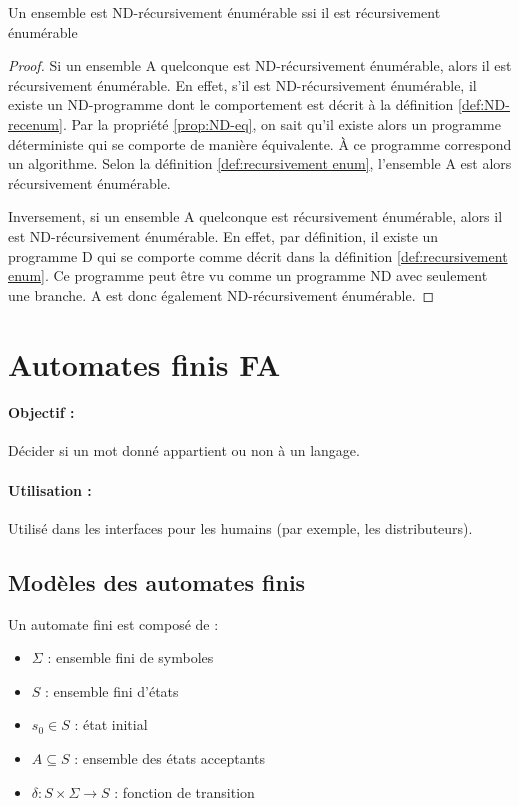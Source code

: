 \begin{myprop}
	Un ensemble est ND-récursivement énumérable ssi il est récursivement énumérable
	\begin{proof}
		Si un ensemble A quelconque est ND-récursivement énumérable, alors il est récursivement
		énumérable.
		En effet, s'il est ND-récursivement énumérable, il existe un ND-programme dont le comportement est décrit à la définition \ref{def:ND-recenum}.
		Par la propriété \ref{prop:ND-eq}, on sait qu'il existe alors un programme déterministe qui se comporte de manière équivalente. À ce programme correspond un algorithme.
		Selon la définition \ref{def:recursivement enum}, l'ensemble A est alors récursivement énumérable.

		Inversement, si un ensemble A quelconque est récursivement énumérable, alors il est ND-récursivement énumérable. En effet, par définition, il existe un programme D qui se comporte comme décrit dans la définition \ref{def:recursivement enum}.
		Ce programme peut être vu comme un programme ND avec seulement une branche. A est donc également ND-récursivement énumérable.
	\end{proof}

\end{myprop}

\section{Automates finis FA}
\label{sub:automates_finis}

\paragraph{Objectif :} Décider si un mot donné appartient ou non à un langage.

\paragraph{Utilisation :} Utilisé dans les interfaces pour les humains (par
exemple, les distributeurs).

\subsection{Modèles des automates finis}
\label{ssub:mod_les_des_automates_finis}
Un automate fini est composé de :

\begin{itemize}
	\item $\Sigma$ : ensemble fini de symboles
	\item $S$ : ensemble fini d'états
	\item $s_0 \in S$ : état initial
	\item $A \subseteq S$ : ensemble des états acceptants
	\item $\delta: S \times \Sigma \rightarrow S$ : fonction de transition
\end{itemize}


